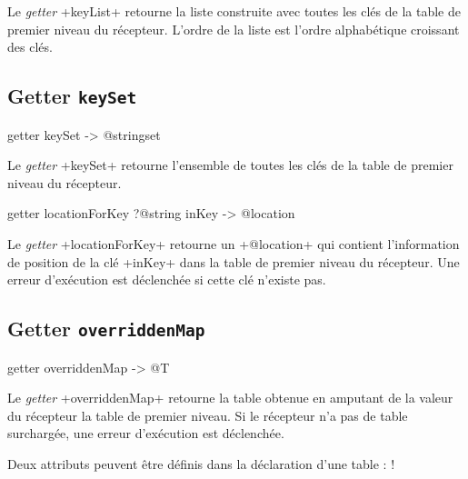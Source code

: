 Le \emph{getter} \ggs+keyList+ retourne la liste construite avec toutes les clés de la table de premier niveau du récepteur. L'ordre de la liste est l'ordre alphabétique croissant des clés.



\subsection{Getter \texttt{keySet}}

\begin{galgas}
getter keySet -> @stringset
\end{galgas}


Le \emph{getter} \ggs+keySet+ retourne l'ensemble de toutes les clés de la table de premier niveau du récepteur.






\begin{galgas}
getter locationForKey ?@string inKey -> @location
\end{galgas}


Le \emph{getter} \ggs+locationForKey+ retourne un \ggs+@location+ qui contient l'information de position de la clé \ggs+inKey+ dans la table de premier niveau du récepteur. Une erreur d'exécution est déclenchée si cette clé n'existe pas.








\subsection{Getter \texttt{overriddenMap}}

\begin{galgas}
getter overriddenMap -> @T
\end{galgas}


Le \emph{getter} \ggs+overriddenMap+ retourne la table obtenue en amputant de la valeur du récepteur la table de premier niveau. Si le récepteur n'a pas de table surchargée, une erreur d'exécution est déclenchée.










Deux attributs peuvent être définis dans la déclaration d'une table : \ggs!%

